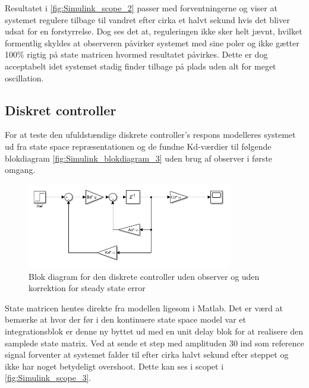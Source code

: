 Resultatet i \autoref{fig:Simulink_scope_2} passer med forventningerne og viser at systemet regulere tilbage til vandret efter cirka et halvt sekund hvis det bliver udsat for en forstyrrelse. Dog ses det at, reguleringen ikke sker helt jævnt, hvilket formentlig skyldes at observeren påvirker systemet med sine poler og ikke gætter 100\% rigtig på state matricen hvormed resultatet påvirkes. Dette er dog acceptabelt idet systemet stadig finder tilbage på plads uden alt for meget oscillation. 

\subsection{Diskret controller}
For at teste den ufuldstændige diskrete controller's respons modelleres systemet ud fra state space repræsentationen og de fundne Kd-værdier til følgende blokdiagram \autoref{fig:Simulink_blokdiagram_3} uden brug af observer i første omgang. 

\begin{figure}[H]
	\centering
	\includegraphics[width = 0.80\textwidth]{figur/Simulink_blokdiagram_3}
	\caption{Blok diagram for den diskrete controller uden observer og uden korrektion for steady state error}
	\label{fig:Simulink_blokdiagram_3}
\end{figure}

State matricen hentes direkte fra modellen ligesom i Matlab. Det er værd at bemærke at hvor der før i den kontinuere state space model var et integrationsblok er denne ny byttet ud med en unit delay blok for at realisere den samplede state matrix. Ved at sende et step med amplituden 30 ind som reference signal forventer at systemet falder til efter cirka halvt sekund efter steppet og ikke har noget betydeligt overshoot. Dette kan ses i scopet i \autoref{fig:Simulink_scope_3}.

